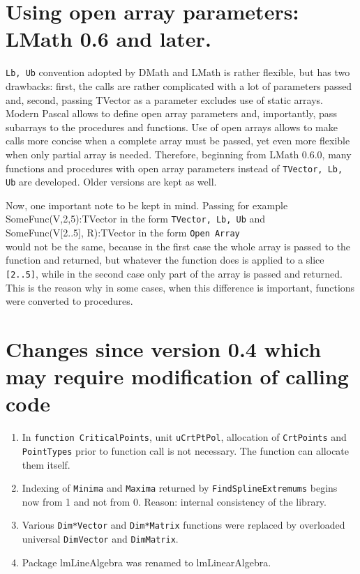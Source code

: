 \documentclass[12pt,a4paper,oneside]{article}
\newcommand{\code}[1]{\texttt{#1}}
\begin{document}
\section{Using open array parameters: LMath 0.6 and later.}
\code{Lb, Ub} convention adopted by DMath and LMath is rather flexible, but has two drawbacks: first, the calls are rather complicated with a lot of parameters passed and, second, passing TVector as a parameter excludes use of static arrays. Modern Pascal allows to define open array parameters and, importantly, pass subarrays to the procedures and functions. Use of open arrays allows to make calls more concise when a complete array must be passed, yet even more flexible when only partial array is needed. Therefore, beginning from LMath 0.6.0, many functions and procedures with open array parameters instead of \code{TVector, Lb, Ub} are developed. Older versions are kept as well.

Now, one important note to be kept in mind. Passing for example \\
SomeFunc(V,2,5):TVector in the form \code{TVector, Lb, Ub} and \\
SomeFunc(V[2..5], R):TVector in the form \code{Open Array} \\ would not be the same, because in the first case the whole array is passed to the function and returned, but whatever the function does is applied to a slice \code{[2..5]}, while in the second case only part of the array is passed and returned. This is the reason why in some cases, when this difference is important, functions were converted to procedures.  
  
\section{Changes since version 0.4 which may require modification of calling code}
\begin{enumerate}
	\item In \code{function CriticalPoints}, unit \code{uCrtPtPol}, allocation of \code{CrtPoints} and \code{PointTypes} prior to function call is not necessary. The function can allocate them itself.
	\item Indexing of \code{Minima} and \code{Maxima} returned by \code{FindSplineExtremums} begins now from 1 and not from 0. Reason: internal consistency of the library.
	\item Various \code{Dim*Vector} and \code{Dim*Matrix} functions were replaced by overloaded universal \code{DimVector} and \code{DimMatrix}.
	\item Package lmLineAlgebra was renamed to lmLinearAlgebra.  
\end{enumerate}
\end{document}
